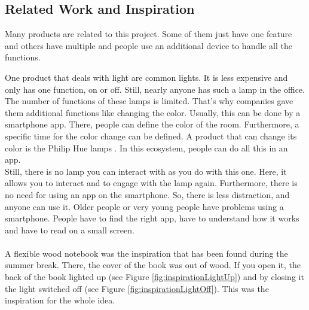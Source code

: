 \documentclass[04_projectProcess.tex]{subfiles}
\begin{document}
    \subsection{Related Work and Inspiration}
        \begin{flushleft}
            Many products are related to this project. Some of them just have one 
            feature and others have multiple and people use an additional device to handle all 
            the functions.
            
            One product that deals with light are common lights. It is less expensive and 
            only has one function, on or off. Still, nearly anyone has such a lamp in the office. \\

            The number of functions of these lamps is limited. That's why companies 
            gave them additional functions like changing the color. Usually, this can be done 
            by a smartphone app. There, people can define the color of the room. Furthermore, 
            a specific time for the color change can be defined. A product that can 
            change its color is the Philip Hue lamps \cite{philipHue}. In this ecosystem,
            people can do all this in an app.  \\ 

            Still, there is no lamp you can interact with as you do with this one. Here, it 
            allows you to interact and to engage with the lamp again. Furthermore, there is no 
            need for using an app on the smartphone. So, there is less distraction, and anyone 
            can use it. Older people or very young people have problems using a smartphone. 
            People have to find the right app, have to understand how it works and have to read 
            on a small screen.  \\~\\

            A flexible wood notebook was the inspiration that has been found during the summer
            break. There, the cover of the book was out of wood. If you open it, the back of the
            book lighted up (see Figure \ref{fig:inspirationLightUp}) and by closing it the 
            light switched off (see Figure \ref{fig:inspirationLightOff}). This was the 
            inspiration for the whole idea. 


\end{flushleft}
\end{document}
